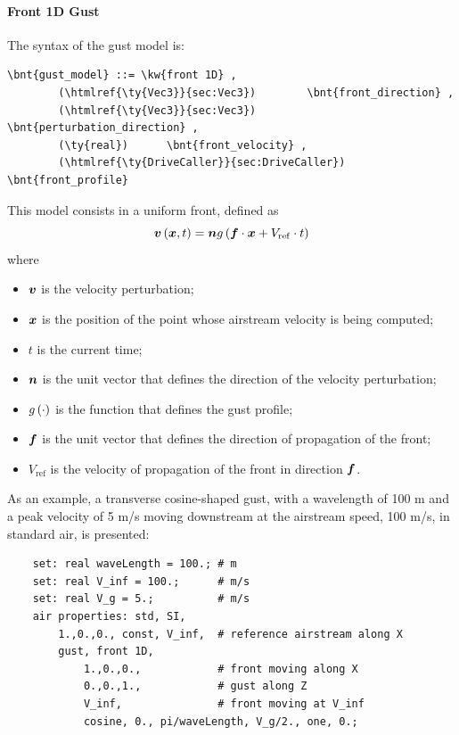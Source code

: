 \paragraph{Front 1D Gust}
The syntax of the  gust model is:
\begin{Verbatim}[commandchars=\\\{\}]
    \bnt{gust_model} ::= \kw{front 1D} ,
        (\htmlref{\ty{Vec3}}{sec:Vec3})        \bnt{front_direction} ,
        (\htmlref{\ty{Vec3}}{sec:Vec3})        \bnt{perturbation_direction} ,
        (\ty{real})      \bnt{front_velocity} ,
        (\htmlref{\ty{DriveCaller}}{sec:DriveCaller}) \bnt{front_profile}
\end{Verbatim}
This model consists in a uniform front, defined as
\begin{displaymath}
	\boldsymbol{v}\left( \boldsymbol{x}, t \right) = \boldsymbol{n} g\left( \boldsymbol{f} \cdot \boldsymbol{x} + V_\mathrm{ref} \cdot t \right)
\end{displaymath}
where
\begin{itemize}
\item $\boldsymbol{v}$ is the velocity perturbation;
\item $\boldsymbol{x}$ is the position of the point whose airstream velocity
is being computed;
\item $t$ is the current time;
\item $\boldsymbol{n}$ is the unit vector  
that defines the direction of the velocity perturbation;
\item $g\left( \cdot \right)$ is the function  
that defines the gust profile;
\item $\boldsymbol{f}$ is the unit vector  
that defines the direction of propagation of the front;
\item $V_\mathrm{ref}$ is the velocity  
of propagation of the front in direction $\boldsymbol{f}$.
\end{itemize}
As an example, a transverse cosine-shaped gust, with a wavelength of 100 m
and a peak velocity of 5 m/s moving downstream at the airstream speed,
100 m/s, in standard air, is presented:
\begin{verbatim}
    set: real waveLength = 100.; # m
    set: real V_inf = 100.;      # m/s
    set: real V_g = 5.;          # m/s
    air properties: std, SI,
        1.,0.,0., const, V_inf,  # reference airstream along X
        gust, front 1D,
            1.,0.,0.,            # front moving along X
            0.,0.,1.,            # gust along Z
            V_inf,               # front moving at V_inf
            cosine, 0., pi/waveLength, V_g/2., one, 0.;
\end{verbatim}



